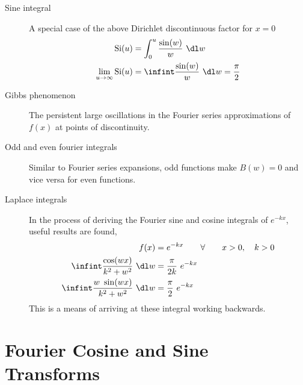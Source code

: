 \begin{description}
    \item[Sine integral] A special case of the above Dirichlet discontinuous factor
        for $ x = 0 $
        \begin{align}
            \text{Si}(u)                     & = \int_{0}^{u}
            \frac{\sin(w)}{w}\ \dl w                                       \\
            \lim_{u \to \infty} \text{Si}(u) & = \infint \frac{\sin(w)}{w}
            \ \dl w = \frac{\pi}{2}
        \end{align}

    \item[Gibbs phenomenon] The persistent large oscillations in the Fourier series
        approximations of $ f(x) $ at points of discontinuity.

    \item[Odd and even fourier integrals] Similar to Fourier series expansions,
        odd functions make $ B(w) = 0 $ and vice versa for even functions.

    \item[Laplace integrals] In the process of deriving the Fourier sine and cosine
        integrals of $ e^{-kx} $, useful results are found,
        \begin{align}
            f(x)                                         & = e^{-kx} \qquad
            \forall \qquad x > 0, \quad k > 0                                        \\
            \infint \frac{\cos(wx)}{k^2 + w^2}\ \dl w    & = \frac{\pi}{2k}\ e^{-kx} \\
            \infint \frac{w\ \sin(wx)}{k^2 + w^2}\ \dl w & = \frac{\pi}{2}\ e^{-kx}
        \end{align}
        This is a means of arriving at these integral working backwards.
\end{description}

\section{Fourier Cosine and Sine Transforms}

